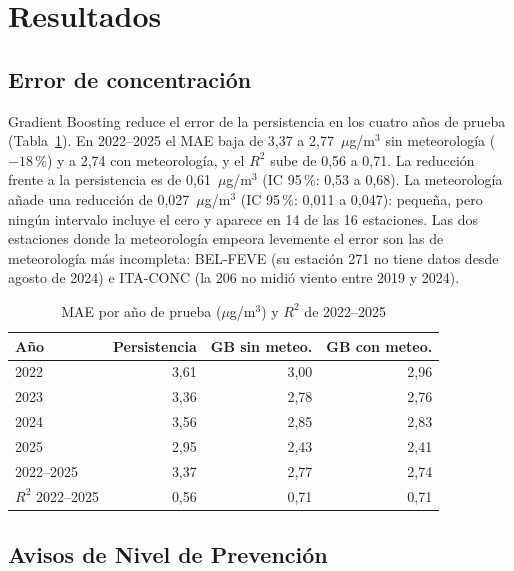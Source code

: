 \documentclass[conference]{IEEEtran}
\begin{document}

\section{Resultados}
\label{sec:resultados}

\subsection{Error de concentración}

Gradient Boosting reduce el error de la persistencia en los cuatro años de
prueba (Tabla~\ref{tab:error}). En 2022--2025 el MAE baja de 3,37 a
2,77~$\mu$g/m$^3$ sin meteorología ($-18$\,\%) y a 2,74 con meteorología, y
el $R^2$ sube de 0,56 a 0,71. La reducción frente a la persistencia es de
0,61~$\mu$g/m$^3$ (IC 95\,\%: 0,53 a 0,68). La meteorología añade una
reducción de 0,027~$\mu$g/m$^3$ (IC 95\,\%: 0,011 a 0,047): pequeña, pero
ningún intervalo incluye el cero y aparece en 14 de las 16 estaciones. Las
dos estaciones donde la meteorología empeora levemente el error son las de
meteorología más incompleta: BEL-FEVE (su estación 271 no tiene datos
desde agosto de 2024) e ITA-CONC (la 206 no midió viento entre 2019 y
2024).

\begin{table}[htbp]
\centering
\caption{MAE por año de prueba ($\mu$g/m$^3$) y $R^2$ de 2022--2025}
\label{tab:error}
\begin{tabular}{lrrr}
\toprule
\textbf{Año} & \textbf{Persistencia} & \textbf{GB sin meteo.} & \textbf{GB con meteo.} \\
\midrule
2022 & 3,61 & 3,00 & 2,96 \\
2023 & 3,36 & 2,78 & 2,76 \\
2024 & 3,56 & 2,85 & 2,83 \\
2025 & 2,95 & 2,43 & 2,41 \\
\midrule
2022--2025 & 3,37 & 2,77 & 2,74 \\
$R^2$ 2022--2025 & 0,56 & 0,71 & 0,71 \\
\bottomrule
\end{tabular}
\end{table}

\subsection{Avisos de Nivel de Prevención}
\end{document}
